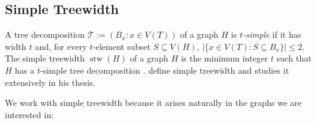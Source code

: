 \documentclass[kpfonts]{patmorin}
\DeclareMathOperator{\stw}{stw}
\theoremstyle{named}
\begin{document}
%

\subsection{Simple Treewidth}


A tree decomposition $\mathcal{T}:=(B_x:x\in V(T))$ of a graph $H$ is \emph{$t$-simple} if it has width $t$ and, for every $t$-element subset $S\subseteq V(H)$, $|\{x\in V(T):S\subseteq B_x\}|\le 2$.  The simple treewidth $\stw(H)$ of a graph $H$ is the minimum integer $t$ such that $H$ has a $t$-simple tree decomposition \cite{knauer.ueckerdt:simple}.  \citet{knauer.ueckerdt:simple} define simple treewidth and  \citet{wulf:stacked} studies it extensively in his thesis.

%

We work with simple treewidth because it arises naturally in the graphs we are interested in:
\end{document}
